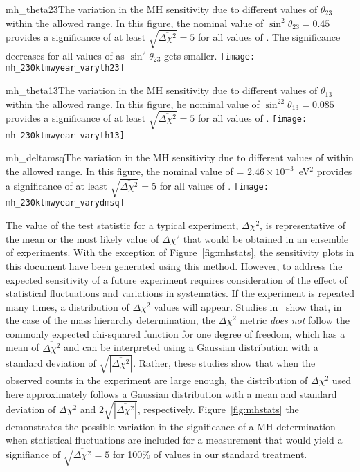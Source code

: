 \begin{cdrfigure}{mh_theta23}{The variation in the MH sensitivity due to different values of $\theta_{23}$ within the allowed range.  In this figure, the nominal value of $\sin^2\theta_{23} = 0.45$ provides a significance of at least $\sqrt{\overline{\Delta\chi^{2}}} = 5$ for all values of \deltacp.  The significance decreases for all values of \deltacp as $\sin^2\theta_{23}$ gets smaller.}
 \texttt{[image: mh\_230ktmwyear\_varyth23]}
\end{cdrfigure}

\begin{cdrfigure}{mh_theta13}{The variation in the MH sensitivity due to different values of $\theta_{13}$ within the allowed range.  In this figure, he nominal value of $\sin^22\theta_{13} = 0.085$ provides a significance of at least $\sqrt{\overline{\Delta\chi^{2}}} = 5$ for all values of \deltacp.}
 \texttt{[image: mh\_230ktmwyear\_varyth13]}
\end{cdrfigure}

\begin{cdrfigure}{mh_deltamsq}{The variation in the MH sensitivity due to different values of  within the allowed range.  In this figure, the nominal value of  = $2.46\times 10^{-3}$~eV$^2$ provides a significance of at least $\sqrt{\overline{\Delta\chi^{2}}} = 5$ for all values of \deltacp.}
 \texttt{[image: mh\_230ktmwyear\_varydmsq]}
\end{cdrfigure}

The value of the test statistic for a typical experiment,  
$\overline{\Delta\chi^2}$, is
representative of the mean or the most likely value of $\Delta\chi^2$ that 
would be obtained in an ensemble of experiments.
With the exception of Figure~\ref{fig:mhstats}, the sensitivity plots
in this document have been generated using this method.
However, to address the expected sensitivity of a future experiment
requires consideration of the effect of
statistical fluctuations and variations in systematics.  If the
experiment is repeated many times, a distribution of $\Delta\chi^2$
values will appear.  Studies in~\cite{Qian:2012zn,Blennow:2013oma}
show that, in the case of the mass hierarchy
determination, the $\Delta \chi^2$ metric
{\em does not} follow the commonly expected chi-squared
function for one degree of freedom, which has a mean of
$\overline{\Delta\chi^2}$ and can be interpreted using a Gaussian
distribution with a standard deviation of
$\sqrt{|\overline{\Delta\chi^2}|}$. Rather, these studies show that
when the observed counts in the experiment are large enough,
the distribution of $\Delta\chi^2$ used here approximately follows
a Gaussian distribution with a
mean and standard deviation of $\overline{\Delta\chi^2}$ and
$2\sqrt{|\overline{\Delta\chi^2}|}$, respectively. Figure~\ref{fig:mhstats} the
demonstrates the possible variation in the significance of a MH determination when statistical
fluctuations are included for a measurement that would yield a signifiance of $\sqrt{\overline{\Delta\chi^{2}}} = 5$ for 100\% of \deltacp values in our standard treatment.

